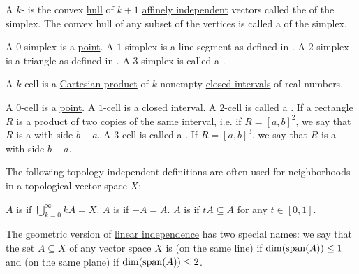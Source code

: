 \begin{definition}\label{def:simplex}
  A \( k \)- is the convex \hyperref[def:convex_hull/hull]{hull} of \( k + 1 \) \hyperref[def:affine_dependence]{affinely independent} vectors called the  of the simplex. The convex hull of any subset of the vertices is called a  of the simplex.

  \begin{thmenum}
     A \( 0 \)-simplex is a \hyperref[def:point]{point}.
     A \( 1 \)-simplex is a line segment as defined in .
     A \( 2 \)-simplex is a triangle as defined in .
     A \( 3 \)-simplex is called a .
  \end{thmenum}
\end{definition}

\begin{definition}\label{def:k_cell}
  A \( k \)-cell is a \hyperref[def:cartesian_product]{Cartesian product} of \( k \) nonempty \hyperref[def:partially_ordered_set_interval/closed]{closed intervals} of real numbers.

  \begin{thmenum}
     A \( 0 \)-cell is a \hyperref[def:point]{point}.
     A \( 1 \)-cell is a closed interval.
     A \( 2 \)-cell is called a . If a rectangle \( R \) is a product of two copies of the same interval, i.e. if \( R = [a, b]^2 \), we say that \( R \) is a  with side \( b - a \).
     A \( 3 \)-cell is called a . If \( R = [a, b]^3 \), we say that \( R \) is a  with side \( b - a \).
  \end{thmenum}
\end{definition}

\begin{definition}\label{def:neighborhood_set_types}
  The following topology-independent definitions are often used for neighborhoods in a topological vector space \( X \):

  \begin{thmenum}
     \( A \) is  if \( \bigcup_{k=0}^\infty kA = X \).
     \( A \) is  if \( -A = A \).
     \( A \) is  if \( tA \subseteq A \) for any \( t \in [0, 1] \).
  \end{thmenum}
\end{definition}

\begin{definition}\label{def:collinear_complanar}
  The geometric version of \hyperref[def:linear_dependence]{linear independence} has two special names: we say that the set \( A \subseteq X \) of any vector space \( X \) is  (on the same line) if \( \dim(\operatorname{span}(A)) \leq 1 \) and  (on the same plane) if \( \dim(\operatorname{span}(A)) \leq 2 \).
\end{definition}
